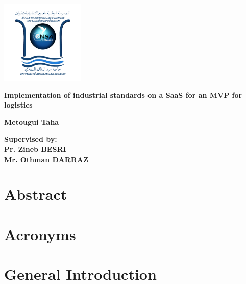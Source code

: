 \documentclass[11pt]{book}
\begin{document}
    \thispagestyle{empty}

    \begin{titlepage}
        \begin{center}
            \includegraphics[width=150px]{images/logoEnsa}

            \vspace*{2cm}

            \Large
            \textbf{Implementation of industrial standards on a SaaS for an MVP for logistics}

            \vspace{0.5cm}
            \large
            \textbf{Metougui Taha}

            \vspace{1.5 cm}

            \textbf{Supervised by:}\\
            \vspace{0.5cm}
            \textbf{Pr. Zineb BESRI}\\
            \vspace{0.5cm}
            \textbf{Mr. Othman DARRAZ}

            \vspace{0.8 cm}
        \end{center}
    \end{titlepage}

    \frontmatter

    \chapter*{Abstract}

    \chapter*{Acronyms}\label{sec:acronyms}
    

    \tableofcontents

    \mainmatter

    \chapter{General Introduction}\label{sec:introduction}
    
\end{document}
